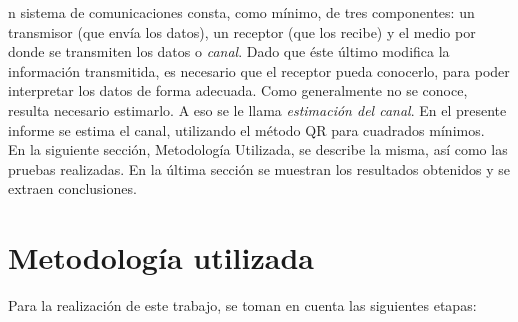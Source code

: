 \documentclass[10pt,journal,compsoc]{IEEEtran}
\begin{document}
%
%
%
%
n sistema de comunicaciones consta, como m\'inimo, de tres componentes: un transmisor (que env\'ia los datos), un receptor (que los recibe) y el medio por donde se transmiten los datos o \textit{canal}. Dado que \'este \'ultimo modifica la informaci\'on transmitida, es necesario que el receptor pueda conocerlo, para poder interpretar los datos de forma adecuada. Como generalmente no se conoce, resulta necesario estimarlo. A eso se le llama \textit{estimaci\'on del canal}. En el presente informe se estima el canal, utilizando el m\'etodo QR para cuadrados m\'inimos.\\
En la siguiente secci\'on, Metodolog\'ia Utilizada, se describe la misma, as\'i como las pruebas realizadas.
En la \'ultima secci\'on se muestran los resultados obtenidos y se extraen conclusiones. \\

\section{Metodolog\'ia utilizada}
Para la realizaci\'on de este trabajo, se toman en cuenta las siguientes etapas:
\end{document}
